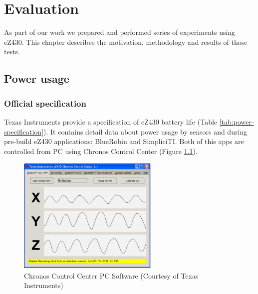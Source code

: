 \chapter{Evaluation}

As part of our work we prepared and performed series of experiments using eZ430.
This chapter describes the motivation, methodology and results of those tests.  

\section{Power usage}

\subsection{Official specification}
Texas Instruments provide a specification of eZ430 battery life (Table \ref{tab:power-specification}).
It contains detail data about power usage by sensors and during pre-build eZ430 applications: BlueRobin and SimpliciTI.
Both of this apps are controlled from PC using Chronos Control Center (Figure \ref{fig:chronos_control_center}).

\begin{figure}[h]
  \centering
  \includegraphics[width=0.6\textwidth]{img/chronos_app_control_center.png}
  \caption{Chronos Control Center PC Software (Courtesy of Texas
  Instruments)}
  \label{fig:chronos_control_center}
\end{figure}


